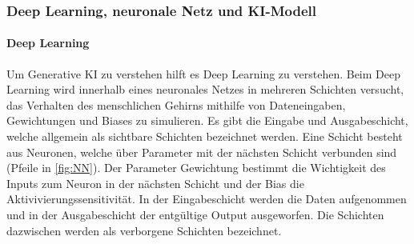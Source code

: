 \subsubsection{Deep Learning, neuronale Netz und KI-Modell}

\paragraph{Deep Learning}
Um Generative KI zu verstehen hilft es Deep Learning zu verstehen.
Beim Deep Learning wird innerhalb eines neuronales Netzes in
mehreren Schichten versucht, 
das Verhalten des menschlichen Gehirns mithilfe von Dateneingaben, 
Gewichtungen und Biases zu simulieren. 
Es gibt die Eingabe und Ausgabeschicht, 
welche allgemein als sichtbare Schichten bezeichnet werden.
Eine Schicht besteht aus Neuronen, welche über Parameter 
mit der nächsten Schicht verbunden sind (Pfeile in \ref{fig:NN}).
Der Parameter Gewichtung bestimmt die Wichtigkeit des Inputs 
zum Neuron in der nächsten Schicht und der Bias die Aktivivierungssensitivität.
In der Eingabeschicht werden die Daten aufgenommen und 
in der Ausgabeschicht der entgültige Output ausgeworfen.
Die Schichten dazwischen werden als verborgene Schichten bezeichnet.
\cite{WasIstDeep2023}
\cite{KuenstlicheIntelligenz}
\\
\\
